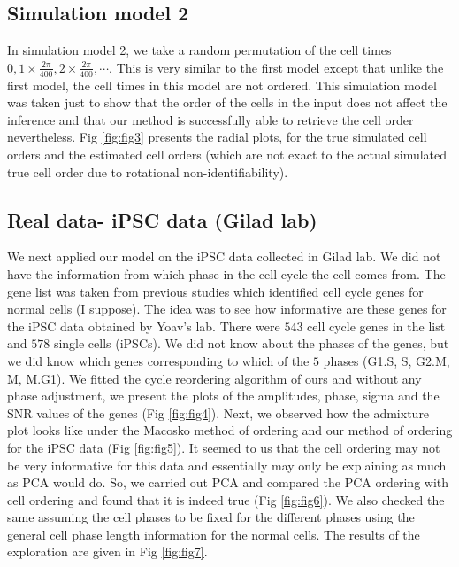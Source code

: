 \documentclass[11pt]{article}
\begin{document}
\subsection{Simulation model 2}

In simulation model 2, we take a random permutation of the cell times $0, 1 \times \frac{2 \pi}{400}, 2 \times \frac{2 \pi}{400}, \cdots $. This is very similar to the first model except that unlike the first model, the cell times in this model are not ordered. This simulation model was taken just to show that the order of the cells in the input does not affect the inference and that our method is successfully able to retrieve the cell order nevertheless. Fig \ref{fig:fig3} presents the radial plots, for the true simulated cell orders and the estimated cell orders (which are not exact to the actual simulated true cell order due to rotational non-identifiability).

\subsection{Real data- iPSC data (Gilad lab)}

We next applied our model on the iPSC data collected in Gilad lab. We did not have the information from which phase in the cell cycle the cell comes from. The gene list was taken from previous studies which identified cell cycle genes for normal cells (I suppose). The idea was to see how informative are these genes for the iPSC data obtained by Yoav's lab. There were $543$ cell cycle genes in the list and $578$ single cells (iPSCs).  We did not know about the phases of the genes, but we did know which genes corresponding to which of the $5$ phases (G1.S, S, G2.M, M, M.G1).  We fitted the cycle reordering algorithm of ours and without any phase adjustment, we present the plots of the amplitudes, phase, sigma and the SNR values of the genes (Fig \ref{fig:fig4}). Next, we observed how the admixture plot looks like under the Macosko method of ordering and our method of ordering for the iPSC data (Fig \ref{fig:fig5}).  It seemed to us that the cell ordering may not be very informative for this data and essentially may only be explaining as much as PCA would do. So, we carried out PCA and compared the PCA ordering with cell ordering and found that it is indeed true (Fig \ref{fig:fig6}). We also checked the same assuming the cell phases to be fixed for the different phases using the general cell phase length information for the normal cells. The results of the exploration are given in Fig \ref{fig:fig7}.
\end{document}
